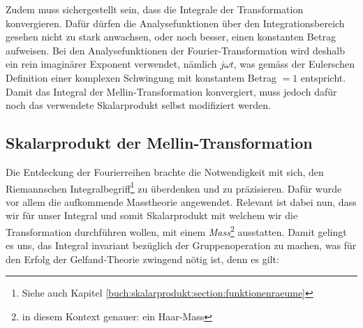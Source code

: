 Zudem muss sichergestellt sein, dass die Integrale der Transformation konvergieren.
Dafür dürfen die Analysefunktionen über den Integrationsbereich gesehen nicht zu 
stark anwachsen, oder noch besser, einen konstanten Betrag aufweisen. 
Bei den Analysefunktionen der Fourier-Transformation wird deshalb ein rein 
imaginärer Exponent verwendet, nämlich $j\omega t$, was gemäss der Eulerschen 
Definition einer komplexen Schwingung mit konstantem Betrag $= 1$ entspricht.
Damit das Integral der Mellin-Transformation konvergiert, muss jedoch dafür 
noch das verwendete Skalarprodukt selbst modifiziert werden.


\subsection{Skalarprodukt der Mellin-Transformation
\label{mellin:subsection:skalarprodukt}}
Die Entdeckung der Fourierreihen brachte die Notwendigkeit mit sich, den 
Riemannschen Integralbegriff\footnote{Siehe auch Kapitel 
\ref{buch:skalarprodukt:section:funktionenraeume}} zu überdenken und zu 
präzisieren.
Dafür wurde vor allem die aufkommende Masstheorie angewendet.
Relevant ist dabei nun, dass wir für unser Integral und somit Skalarprodukt 
mit welchem wir die Transformation durchführen wollen, 
mit einem {\em Mass}\footnote{in diesem Kontext genauer: ein Haar-Mass} 
ausstatten. 
Damit gelingt es uns, das Integral 
invariant bezüglich der Gruppenoperation zu machen, was für den 
Erfolg der Gelfand-Theorie zwingend nötig ist, denn es gilt:

